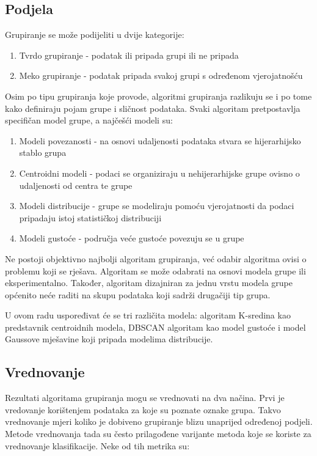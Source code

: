 \documentclass[utf8, diplomski, numeric]{fer}
\begin{document}
\subsection{Podjela}
Grupiranje se može podijeliti u dvije kategorije:

\begin{enumerate}
\item Tvrdo grupiranje - podatak ili pripada grupi ili ne pripada
\item Meko grupiranje - podatak pripada svakoj grupi s određenom vjerojatnošću
\end{enumerate}

Osim po tipu grupiranja koje provode, algoritmi grupiranja razlikuju se i po tome kako definiraju pojam grupe i sličnost podataka. Svaki algoritam pretpostavlja specifičan model grupe, a najčešći modeli su:

\begin{enumerate}
\item Modeli povezanosti - na osnovi udaljenosti podataka stvara se hijerarhijsko stablo grupa 
\item Centroidni modeli - podaci se organiziraju u nehijerarhijske grupe ovisno o udaljenosti od centra te grupe
\item Modeli distribucije - grupe se modeliraju pomoću vjerojatnosti da podaci pripadaju istoj statističkoj distribuciji
\item Modeli gustoće - područja veće gustoće povezuju se u grupe
\end{enumerate}

Ne postoji objektivno najbolji algoritam grupiranja, već odabir algoritma ovisi o problemu koji se rješava. Algoritam se može odabrati na osnovi modela grupe ili eksperimentalno. Također, algoritam dizajniran za jednu vrstu modela grupe općenito neće raditi na skupu podataka koji sadrži drugačiji tip grupa.

U ovom radu uspoređivat će se tri različita modela: algoritam K-sredina kao predstavnik centroidnih modela, DBSCAN algoritam kao model gustoće i model Gaussove mješavine koji pripada modelima distribucije.

\subsection{Vrednovanje}
Rezultati algoritama grupiranja mogu se vrednovati na dva načina. Prvi je vredovanje korištenjem podataka za koje su poznate oznake grupa. Takvo vrednovanje mjeri koliko je dobiveno grupiranje blizu unaprijed određenoj podjeli. Metode vrednovanja tada su često prilagođene varijante metoda koje se koriste za vrednovanje klasifikacije. Neke od tih metrika su:
\end{document}

